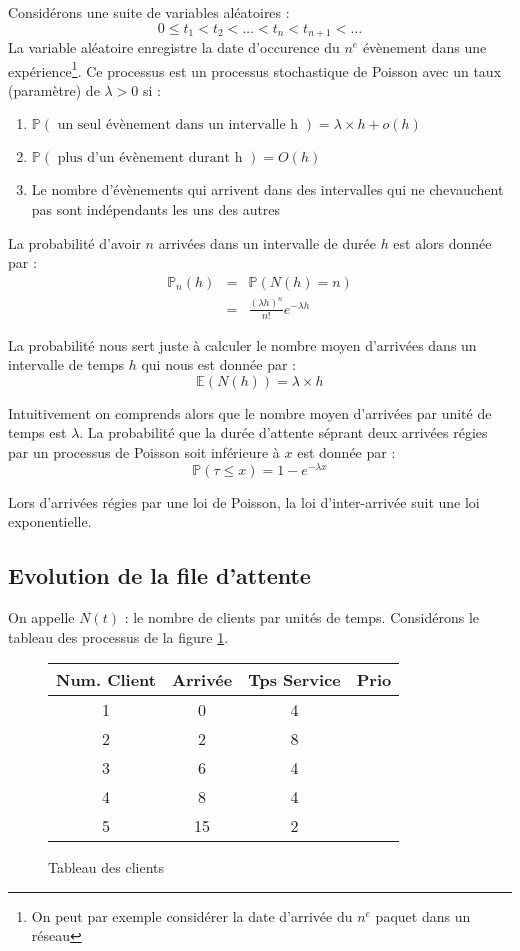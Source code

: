 \documentclass[a4paper, 11pt, fleqn]{article}
\newcommand{\VA}[0]{variable aléatoire }
\newcommand{\VAs}[0]{variables aléatoires }
\newcommand{\Prob}[0]{\mathbb{P} }
\begin{document}
Considérons une suite de \VAs : $$
0 \leq t_1 < t_2 < \dots < t_n < t_{n+1} < \dots $$
La \VA enregistre la date d'occurence du $n^e$ évènement dans une expérience\footnote{On peut par
exemple considérer la date d'arrivée du $n^e$ paquet dans un réseau}. Ce processus est un processus
stochastique de Poisson avec un taux (paramètre) de $\lambda > 0$ si :
\begin{enumerate}
	\item $\Prob (\mbox{ un seul évènement dans un intervalle h }) = \lambda \times h + o(h)$
	\item $\Prob (\mbox{ plus d'un évènement durant h }) = O(h)$
	\item Le nombre d'évènements qui arrivent dans des intervalles qui ne chevauchent pas sont
		indépendants les uns des autres
\end{enumerate}

La probabilité d'avoir $n$ arrivées dans un intervalle de durée $h$ est alors donnée par : $$
\begin{array}{lcr}
	\Prob_n(h) &= &\Prob (N (h) = n) \\
						 			&=& \frac{(\lambda h) ^ n}{n !} e^{-\lambda h}
\end{array} $$

La probabilité nous sert juste à calculer le nombre moyen d'arrivées dans un intervalle de temps $h$
qui nous est donnée par : $$
\mathbb{E} (N(h)) = \lambda \times h $$

Intuitivement on comprends alors que le nombre moyen d'arrivées par unité de temps est $\lambda$. La
probabilité que la durée d'attente séprant deux arrivées régies par un processus de Poisson soit
inférieure à $x$ est donnée par : $$
\Prob(\tau \leq x) = 1 - e^{-\lambda x} $$

Lors d'arrivées régies par une loi de Poisson, la loi d'inter-arrivée suit une loi exponentielle.

\subsection{Evolution de la file d'attente}

On appelle $N(t)$ : le nombre de clients par unités de temps. Considérons le tableau des processus
de la figure \ref{tab}.


\begin{figure}
	\begin{center}
	\begin{tabular}{|c|c|c|c|}
		\hline
		Num. Client & Arrivée & Tps Service & Prio \\
		\hline
		1 & 0 & 4 & \\
		\hline 
		2&2&8&\\
		\hline 
		3&6&4& \\
		\hline 
		4&8&4& \\
		\hline 
		5 & 15 & 2 & \\
		\hline
	\end{tabular}
	\end{center}
	\caption{Tableau des clients}
	\label{tab}
\end{figure}
\end{document}
